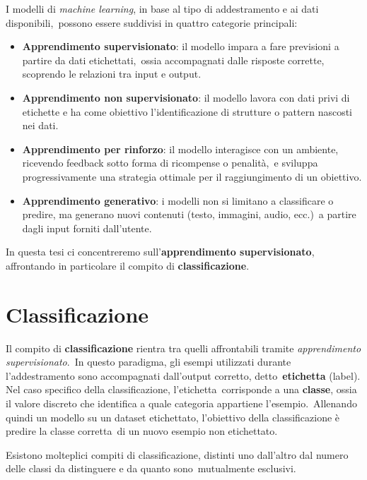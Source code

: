 I modelli di \textit{machine learning}, in base al tipo di addestramento e ai dati disponibili,\
possono essere suddivisi in quattro categorie principali:

\begin{itemize}
      \item \textbf{Apprendimento supervisionato}: il modello impara a fare previsioni a partire da dati etichettati,\
            ossia accompagnati dalle risposte corrette, scoprendo le relazioni tra input e output.
      \item \textbf{Apprendimento non supervisionato}: il modello lavora con dati privi di etichette e ha come obiettivo l'identificazione di strutture o pattern nascosti nei dati.
      \item \textbf{Apprendimento per rinforzo}: il modello interagisce con un ambiente, ricevendo feedback sotto forma di ricompense o penalità,\
            e sviluppa progressivamente una strategia ottimale per il raggiungimento di un obiettivo.
      \item \textbf{Apprendimento generativo}: i modelli non si limitano a classificare o predire, ma generano nuovi contenuti (testo, immagini, audio, ecc.)\
            a partire dagli input forniti dall'utente.
\end{itemize}

In questa tesi ci concentreremo sull'\textbf{apprendimento supervisionato}, affrontando in particolare il compito di \textbf{classificazione}.

\section{Classificazione}

Il compito di \textbf{classificazione} rientra tra quelli affrontabili tramite \textit{apprendimento supervisionato}.\
In questo paradigma, gli esempi utilizzati durante l'addestramento sono accompagnati dall'output corretto, detto\
\textbf{etichetta} (label). Nel caso specifico della classificazione, l'etichetta\
corrisponde a una \textbf{classe}, ossia il valore discreto che identifica a quale categoria appartiene l'esempio.\
Allenando quindi un modello su un dataset etichettato, l'obiettivo della classificazione è predire la classe corretta\
di un nuovo esempio non etichettato.

Esistono molteplici compiti di classificazione, distinti uno dall'altro dal numero delle classi da distinguere e da quanto sono\
mutualmente esclusivi.

